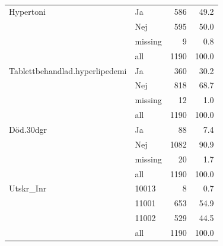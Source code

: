 \begin{table}[ht]
{\begin{tabular}{ll|rr}
   \hline
\hline
Hypertoni & Ja & 586 & 49.2 \\ 
   & Nej & 595 & 50.0 \\ 
   & missing & 9 & 0.8 \\ 
   \hline
 & all & 1190 & 100.0 \\ 
   \hline
\hline
Tablettbehandlad.hyperlipedemi & Ja & 360 & 30.2 \\ 
   & Nej & 818 & 68.7 \\ 
   & missing & 12 & 1.0 \\ 
   \hline
 & all & 1190 & 100.0 \\ 
   \hline
\hline
Död.30dgr & Ja & 88 & 7.4 \\ 
   & Nej & 1082 & 90.9 \\ 
   & missing & 20 & 1.7 \\ 
   \hline
 & all & 1190 & 100.0 \\ 
   \hline
\hline
Utskr\_Inr & 10013 & 8 & 0.7 \\ 
   & 11001 & 653 & 54.9 \\ 
   & 11002 & 529 & 44.5 \\ 
   \hline
 & all & 1190 & 100.0 \\ 
   \hline
\hline
\end{tabular}
}
\caption{} 
\label{}
\end{table}


\restoregeometry


%

